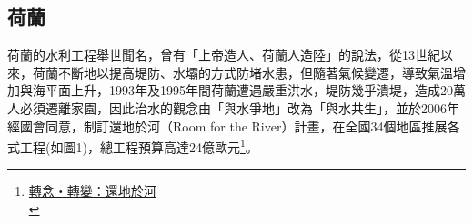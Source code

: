 \documentclass[a4paper,12pt]{article}
\begin{document}
\subsection{荷蘭}
\label{sec:org0a1a435}
荷蘭的水利工程舉世聞名，曾有「上帝造人、荷蘭人造陸」的說法，從13世紀以來，荷蘭不斷地以提高堤防、水壩的方式防堵水患，但隨著氣候變遷，導致氣溫增加與海平面上升，1993年及1995年間荷蘭遭遇嚴重洪水，堤防幾乎潰堤，造成20萬人必須遷離家園，因此治水的觀念由「與水爭地」改為「與水共生」，並於2006年經國會同意，制訂還地於河（Room for the River）計畫，在全國34個地區推展各式工程(如圖1)，總工程預算高達24億歐元\footnote{\href{https://epaper.land.gov.taipei/Item/Detail/\%E6\%89\%93\%E9\%80\%A0\%E9\%9F\%8C\%E6\%80\%A7\%E5\%9F\%8E\%E5\%B8\%82\%E2\%80\%94\%E8\%8D\%B7\%E8\%98\%AD\%E5\%A5\%88\%E6\%A2\%85\%E4\%BA\%A8\%E9\%82\%84\%E5\%9C\%B0\%E6\%96\%BC\%E6\%B2\%B3\%E8\%A8\%88\%E7\%95\%AB}{轉念・轉變：還地於河 }\\\label{orgf04ac85}}。\\
\end{document}
